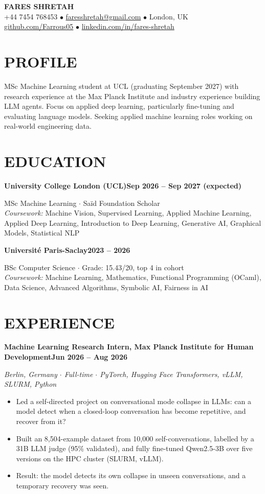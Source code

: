 \documentclass[10pt, a4paper]{article}
\newcommand{\entry}[2]{\vspace{5pt}\textbf{#1}\hfill\textbf{#2}\par}
\newcommand{\sub}[1]{\textit{#1}\par}
\begin{document}
\begin{center}
    {\huge \textbf{FARES SHRETAH}} \\[3pt]
    \small +44 7454 768453 $\bullet$ \href{mailto:faresshretah@gmail.com}{faresshretah@gmail.com} $\bullet$ London, UK \\
    \small \href{https://github.com/Farrous05}{github.com/Farrous05} $\bullet$ \href{https://www.linkedin.com/in/fares-shretah/}{linkedin.com/in/fares-shretah}
\end{center}

\section*{PROFILE}
MSc Machine Learning student at UCL (graduating September 2027) with research experience at the Max Planck Institute and industry experience building LLM agents. Focus on applied deep learning, particularly fine-tuning and evaluating language models. Seeking applied machine learning roles working on real-world engineering data.

\section*{EDUCATION}
\entry{University College London (UCL)}{Sep 2026 -- Sep 2027 (expected)}
MSc Machine Learning $\cdot$ Sa\"id Foundation Scholar \\
\textit{Coursework:} Machine Vision, Supervised Learning, Applied Machine Learning, Applied Deep Learning, Introduction to Deep Learning, Generative AI, Graphical Models, Statistical NLP

\entry{Universit\'e Paris-Saclay}{2023 -- 2026}
BSc Computer Science $\cdot$ Grade: 15.43/20, top 4 in cohort \\
\textit{Coursework:} Machine Learning, Mathematics, Functional Programming (OCaml), Data Science, Advanced Algorithms, Symbolic AI, Fairness in AI

\section*{EXPERIENCE}
\entry{Machine Learning Research Intern, Max Planck Institute for Human Development}{Jun 2026 -- Aug 2026}
\sub{Berlin, Germany $\cdot$ Full-time $\cdot$ PyTorch, Hugging Face Transformers, vLLM, SLURM, Python}
\begin{itemize}
    \item Led a self-directed project on conversational mode collapse in LLMs: can a model detect when a closed-loop conversation has become repetitive, and recover from it?
    \item Built an 8,504-example dataset from 10,000 self-conversations, labelled by a 31B LLM judge (95\% validated), and fully fine-tuned Qwen2.5-3B over five versions on the HPC cluster (SLURM, vLLM).
    \item Result: the model detects its own collapse in unseen conversations, and a temporary recovery was seen.
\end{itemize}
\end{document}
